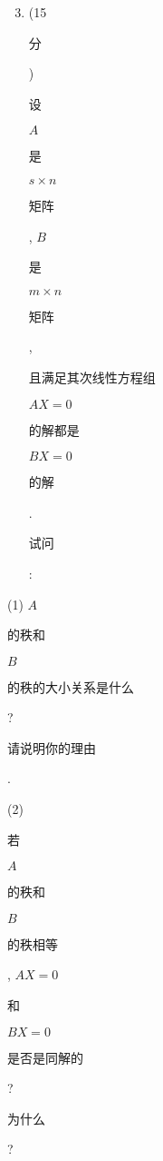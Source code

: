 \documentclass[10pt]{article}
\begin{document}
\begin{enumerate}
  \setcounter{enumi}{2}
  \item (15 \begin{CJK}{UTF8}{mj}分\end{CJK}) \begin{CJK}{UTF8}{mj}设\end{CJK} $A$ \begin{CJK}{UTF8}{mj}是\end{CJK} $s \times n$ \begin{CJK}{UTF8}{mj}矩阵\end{CJK}, $B$ \begin{CJK}{UTF8}{mj}是\end{CJK} $m \times n$ \begin{CJK}{UTF8}{mj}矩阵\end{CJK}, \begin{CJK}{UTF8}{mj}且满足其次线性方程组\end{CJK} $A X=0$ \begin{CJK}{UTF8}{mj}的解都是\end{CJK} $B X=0$ \begin{CJK}{UTF8}{mj}的解\end{CJK}. \begin{CJK}{UTF8}{mj}试问\end{CJK}:
\end{enumerate}
(1) $A$ \begin{CJK}{UTF8}{mj}的秩和\end{CJK} $B$ \begin{CJK}{UTF8}{mj}的秩的大小关系是什么\end{CJK}? \begin{CJK}{UTF8}{mj}请说明你的理由\end{CJK}.

(2) \begin{CJK}{UTF8}{mj}若\end{CJK} $A$ \begin{CJK}{UTF8}{mj}的秩和\end{CJK} $B$ \begin{CJK}{UTF8}{mj}的秩相等\end{CJK}, $A X=0$ \begin{CJK}{UTF8}{mj}和\end{CJK} $B X=0$ \begin{CJK}{UTF8}{mj}是否是同解的\end{CJK}? \begin{CJK}{UTF8}{mj}为什么\end{CJK}?
\end{document}
